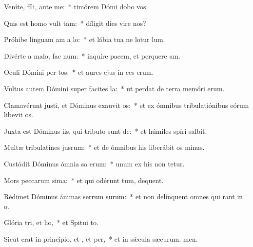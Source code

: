\item Veníte, fíli, aute me:~* timórem Dómi dobo vos.
\item Quis est homo  vult tam:~* díligit dies vire nos?
\item Próhibe linguam am a lo:~* et lábia tua ne lotur lum.
\item Divérte a malo,  fac num:~* inquíre pacem, et perquere am.
\item Oculi Dómini per tos:~* et aures ejus in ces erum.
\item Vultus autem Dómini super facites la:~* ut perdat de terra memóri erum.
\item Clamavérunt justi, et Dóminus exauvit os:~* et ex ómnibus tribulatiónibus eórum libevit os.
\item Juxta est Dóminus iis, qui tributo sunt de:~* et húmiles spíri salbit.
\item Multæ tribulatines jusrum:~* et de ómnibus his liberábit os minus.
\item Custódit Dóminus ómnia sa erum:~* unum ex his non tetur.
\item Mors peccarum sima:~* et qui odérunt tum, dequent.
\item Rédimet Dóminus ánimas serrum surum:~* et non delínquent omnes qui rant in o.
\item Glória tri, et lio,~* et Spitui to.
\item Sicut erat in princípio, et , et per,~* et in sǽcula sæcurum. men.
